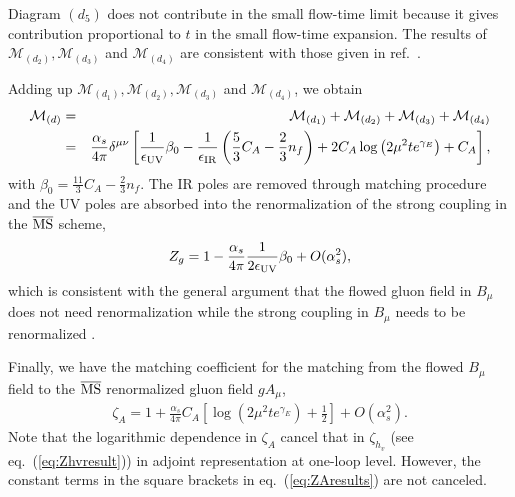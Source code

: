 Diagram $(d_5)$ does not contribute in the small flow-time limit because it gives contribution proportional to $t$ in the small flow-time expansion.
The results of $\mathcal{M}_{(d_2)}, \mathcal{M}_{(d_3)}$ and $\mathcal{M}_{(d_4)}$ are consistent with those given in ref.~\cite{Makino:2014taa}. 

Adding up $\mathcal{M}_{(d_1)}, \mathcal{M}_{(d_2)}, \mathcal{M}_{(d_3)}$ and $\mathcal{M}_{(d_4)}$, we obtain
\begin{eqnarray}
\label{eq:dsum}
\mathcal{M}_{(d)} 
&=&\mathcal{M}_{(d_1)} + \mathcal{M}_{(d_2)} + \mathcal{M}_{(d_3)} + \mathcal{M}_{(d_4)} \nonumber\\
&=& \frac{\alpha_s}{4\pi}\delta^{\mu\nu}\left[\frac{1}{\epsilon_{\rm UV}} \beta_0 - \frac{1}{\epsilon_{\rm IR}} \left(\frac{5}{3}C_A - \frac{2}{3}n_f\right)+ 2 C_A\log\left(2\mu^2 te^{\gamma_E}\right)  +C_A\right],
\end{eqnarray}
with $\beta_0=\frac{11}{3}C_A - \frac{2}{3}n_f$.
The IR poles are removed through matching procedure and the UV poles are absorbed into the renormalization of the strong coupling in the $\overline{\rm MS}$ scheme,
\begin{eqnarray}
Z_g = 1 - \frac{\alpha_s}{4\pi}\frac{1}{2\epsilon_{\rm UV}}\beta_0 + O(\alpha_s^2),
\end{eqnarray}
which is consistent with the general argument that the flowed gluon field in $B_{\mu}$ does not need renormalization while the strong coupling in $B_{\mu}$ needs to be renormalized \cite{Luscher:2011bx}.

Finally, we have the matching coefficient for the matching from the flowed $B_{\mu}$ field to the $\overline{\rm MS}$ renormalized gluon field $gA_{\mu}$, 
\begin{eqnarray}
\label{eq:ZAresults}
\zeta_A = 1+  \frac{\alpha_s}{4\pi}C_A\left[ \log\left(2\mu^2 te^{\gamma_E}\right)  +\frac{1}{2}\right] + O(\alpha_s^2).
\end{eqnarray}
Note that the logarithmic dependence in $\zeta_A $ cancel that in $\zeta_{h_v}$ (see eq.~(\ref{eq:Zhvresult})) in adjoint representation at one-loop level. However, the constant terms in the square brackets in eq.~(\ref{eq:ZAresults}) are not canceled.
